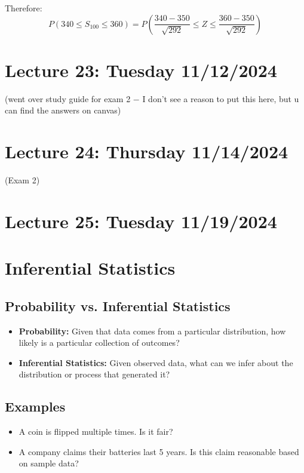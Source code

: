 \documentclass{article}
\begin{document}
    Therefore:
    \[P(340 \leq S_{100} \leq 360) = P\left(\frac{340 - 350}{\sqrt{292}} \leq Z \leq \frac{360 - 350}{\sqrt{292}}\right)\]


    \section*{Lecture 23: Tuesday 11/12/2024}

    (went over study guide for exam 2 $-$ I don't see a reason to put this here, but u can find the answers on canvas)

    \section*{Lecture 24: Thursday 11/14/2024}

    (Exam 2)

    \section*{Lecture 25: Tuesday 11/19/2024}

    \section*{Inferential Statistics}

    \subsection*{Probability vs. Inferential Statistics}
    \begin{itemize}
        \item \textbf{Probability:} Given that data comes from a particular distribution, how likely is a particular collection of outcomes?
        \item \textbf{Inferential Statistics:} Given observed data, what can we infer about the distribution or process that generated it?
    \end{itemize}

    \subsection*{Examples}
    \begin{itemize}
        \item A coin is flipped multiple times. Is it fair?
        \item A company claims their batteries last 5 years. Is this claim reasonable based on sample data?
    \end{itemize}
\end{document}
